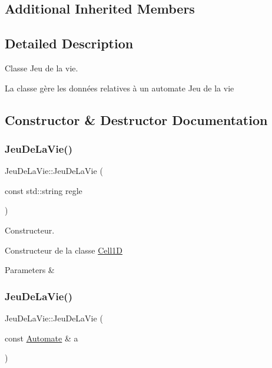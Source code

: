 \subsection*{Additional Inherited Members}


\subsection{Detailed Description}
Classe Jeu de la vie. 

La classe gère les données relatives à un automate Jeu de la vie 

\subsection{Constructor \& Destructor Documentation}
\mbox{\label{class_jeu_de_la_vie_a0288682b1dbed61efe96f6a41850ea29}} 
\subsubsection{\texorpdfstring{Jeu\+De\+La\+Vie()}{JeuDeLaVie()}\hspace{0.1cm}{\footnotesize\ttfamily [1/2]}}
{\footnotesize\ttfamily Jeu\+De\+La\+Vie\+::\+Jeu\+De\+La\+Vie (\begin{DoxyParamCaption}\item[{const std\+::string}]{regle }\end{DoxyParamCaption})}



Constructeur. 

Constructeur de la classe \mbox{\hyperlink{class_cell1_d}{Cell1D}}


\begin{DoxyParams}{Parameters}
{\em } & \\
\hline
\end{DoxyParams}
\mbox{\label{class_jeu_de_la_vie_ae7ddf1c20448c56ef04bd31a332bb1ab}} 
\subsubsection{\texorpdfstring{Jeu\+De\+La\+Vie()}{JeuDeLaVie()}\hspace{0.1cm}{\footnotesize\ttfamily [2/2]}}
{\footnotesize\ttfamily Jeu\+De\+La\+Vie\+::\+Jeu\+De\+La\+Vie (\begin{DoxyParamCaption}\item[{const \mbox{\hyperlink{class_automate}{Automate}} \&}]{a }\end{DoxyParamCaption})}



